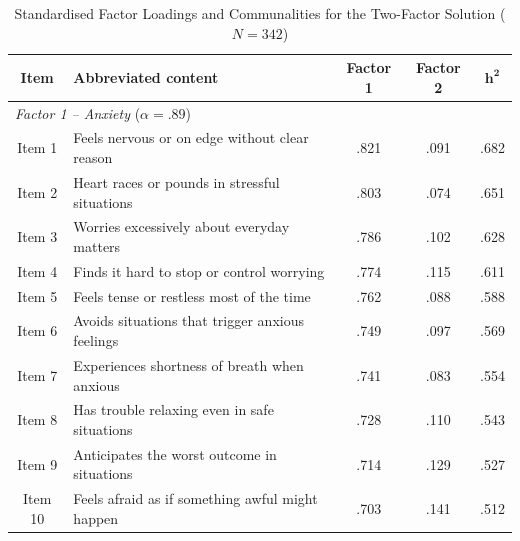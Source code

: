 \documentclass[12pt, a4paper]{article}
\begin{document}
\begin{table}[ht]
\centering
\caption{Standardised Factor Loadings and Communalities for the Two-Factor Solution ($N = 342$)}
\label{tab:cfa}

\begin{tabular}{clccc}
\toprule
\textbf{Item} & \textbf{Abbreviated content} & \textbf{Factor 1} & \textbf{Factor 2} & $\mathbf{h^2}$ \\
\midrule

\multicolumn{5}{l}{\textit{Factor 1 -- Anxiety} ($\alpha = .89$)} \\[3pt]
\rowcolor{factor1col} Item 1  & Feels nervous or on edge without clear reason  & .821 & .091 & .682 \\
\rowcolor{factor1col} Item 2  & Heart races or pounds in stressful situations  & .803 & .074 & .651 \\
\rowcolor{factor1col} Item 3  & Worries excessively about everyday matters     & .786 & .102 & .628 \\
\rowcolor{factor1col} Item 4  & Finds it hard to stop or control worrying      & .774 & .115 & .611 \\
\rowcolor{factor1col} Item 5  & Feels tense or restless most of the time       & .762 & .088 & .588 \\
\rowcolor{factor1col} Item 6  & Avoids situations that trigger anxious feelings & .749 & .097 & .569 \\
\rowcolor{factor1col} Item 7  & Experiences shortness of breath when anxious   & .741 & .083 & .554 \\
\rowcolor{factor1col} Item 8  & Has trouble relaxing even in safe situations   & .728 & .110 & .543 \\
\rowcolor{factor1col} Item 9  & Anticipates the worst outcome in situations    & .714 & .129 & .527 \\
\rowcolor{factor1col} Item 10 & Feels afraid as if something awful might happen & .703 & .141 & .512 \\[6pt]


\end{tabular}
\end{table}
\end{document}
